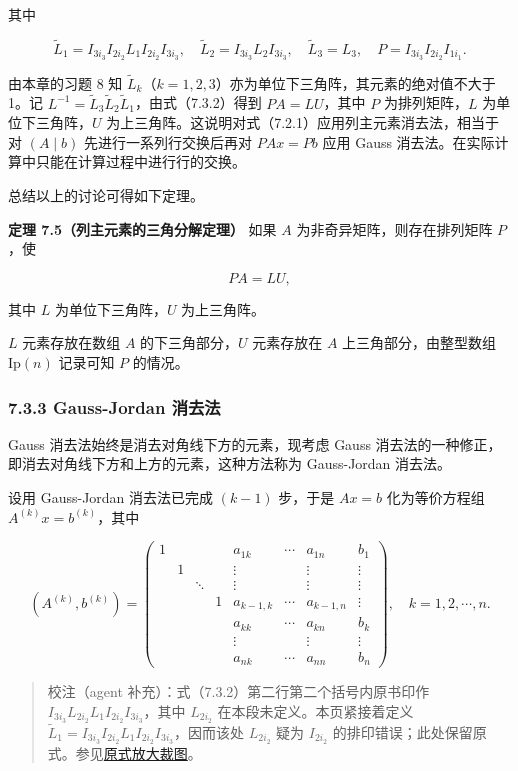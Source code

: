 \documentclass[
  10pt,
  fontset=fandol]{ctexart}
\begin{document}
其中

\[\widetilde{L}_1=I_{3i_3}I_{2i_2}L_1I_{2i_2}I_{3i_3},\quad
\widetilde{L}_2=I_{3i_3}L_2I_{3i_3},\quad
\widetilde{L}_3=L_3,\quad P=I_{3i_3}I_{2i_2}I_{1i_1}.\]

由本章的习题 8 知 \(\widetilde{L}_k\)（\(k=1,2,3\)）亦为单位下三角阵，其元素的绝对值不大于 1。记 \(L^{-1}=\widetilde{L}_3\widetilde{L}_2\widetilde{L}_1\)，由式（7.3.2）得到 \(PA=LU\)，其中 \(P\) 为排列矩阵，\(L\) 为单位下三角阵，\(U\) 为上三角阵。这说明对式（7.2.1）应用列主元素消去法，相当于对 \((A\mid b)\) 先进行一系列行交换后再对 \(PAx=Pb\) 应用 Gauss 消去法。在实际计算中只能在计算过程中进行行的交换。

总结以上的讨论可得如下定理。

\textbf{定理 7.5（列主元素的三角分解定理）} 如果 \(A\) 为非奇异矩阵，则存在排列矩阵 \(P\)，使

\[PA=LU,\]

其中 \(L\) 为单位下三角阵，\(U\) 为上三角阵。

\(L\) 元素存放在数组 \(A\) 的下三角部分，\(U\) 元素存放在 \(A\) 上三角部分，由整型数组 \(\mathrm{Ip}(n)\) 记录可知 \(P\) 的情况。

\subsubsection{7.3.3 Gauss-Jordan 消去法}\label{gauss-jordan-ux6d88ux53bbux6cd5}

Gauss 消去法始终是消去对角线下方的元素，现考虑 Gauss 消去法的一种修正，即消去对角线下方和上方的元素，这种方法称为 Gauss-Jordan 消去法。

设用 Gauss-Jordan 消去法已完成 \((k-1)\) 步，于是 \(Ax=b\) 化为等价方程组 \(A^{(k)}x=b^{(k)}\)，其中

\[
(A^{(k)},b^{(k)})=\left(\begin{array}{ccccccc|c}
1&&&&a_{1k}&\cdots&a_{1n}&b_1\\
&1&&&\vdots&&\vdots&\vdots\\
&&\ddots&&\vdots&&\vdots&\vdots\\
&&&1&a_{k-1,k}&\cdots&a_{k-1,n}&\vdots\\
&&&&a_{kk}&\cdots&a_{kn}&b_k\\
&&&&\vdots&&\vdots&\vdots\\
&&&&a_{nk}&\cdots&a_{nn}&b_n
\end{array}\right),\quad k=1,2,\cdots,n.
\]

\begin{quote}
校注（agent 补充）：式（7.3.2）第二行第二个括号内原书印作 \(I_{3i_3}L_{2i_2}L_1I_{2i_2}I_{3i_3}\)，其中 \(L_{2i_2}\) 在本段未定义。本页紧接着定义 \(\widetilde{L}_1=I_{3i_3}I_{2i_2}L_1I_{2i_2}I_{3i_3}\)，因而该处 \(L_{2i_2}\) 疑为 \(I_{2i_2}\) 的排印错误；此处保留原式。参见\href{/Users/xiangjunfeng/Desktop/数值计算专用/numerical-analysis/book/staging/ch07a/assets/pdf-188-permutation-detail.png}{原式放大裁图}。
\end{quote}
\end{document}
